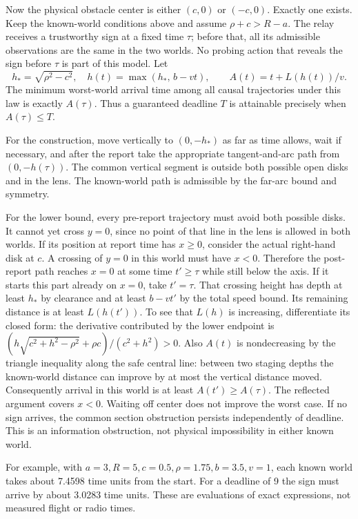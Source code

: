 \documentclass[11pt]{article}
\begin{document}
Now the physical obstacle center is either \((c,0)\) or \((-c,0)\).
Exactly one exists. Keep the known-world conditions above and assume
\(\rho+c>R-a\). The relay receives a trustworthy sign at a fixed
time \(\tau\); before that, all its admissible observations are the
same in the two worlds. No probing action that reveals the sign
before \(\tau\) is part of this model. Let
\[
 h_*=\sqrt{\rho^2-c^2},\quad
 h(t)=\max(h_*,\,b-vt),\qquad
 A(t)=t+L(h(t))/v .
\]
The minimum worst-world arrival time among all causal trajectories
under this law is exactly \(A(\tau)\). Thus a guaranteed deadline
\(T\) is attainable precisely when \(A(\tau)\le T\).

For the construction, move vertically to \((0,-h_*)\) as far as
time allows, wait if necessary, and after the report take the
appropriate tangent-and-arc path from \((0,-h(\tau))\).
The common vertical segment is outside both possible open disks
and in the lens. The known-world path is admissible by the
far-arc bound and symmetry.

For the lower bound, every pre-report trajectory must avoid
both possible disks. It cannot yet cross \(y=0\), since no point
of that line in the lens is allowed in both worlds. If its
position at report time has \(x\geq0\), consider the actual
right-hand disk at \(c\). A crossing of \(y=0\) in this world
must have \(x<0\). Therefore the post-report path reaches
\(x=0\) at some time \(t'\geq\tau\) while still below the axis.
If it starts this part already on \(x=0\), take \(t'=\tau\).
That crossing height has depth at least \(h_*\) by clearance
and at least \(b-vt'\) by the total speed bound. Its remaining
distance is at least \(L(h(t'))\). To see that \(L(h)\) is
increasing, differentiate its closed form: the derivative
contributed by the lower endpoint is
\((h\sqrt{c^2+h^2-\rho^2}+\rho c)/(c^2+h^2)>0\).
Also \(A(t)\) is nondecreasing by the triangle inequality along
the safe central line: between two staging depths the known-world
distance can improve by at most the vertical distance moved.
Consequently arrival in this world is at least \(A(t')\geq
A(\tau)\). The reflected argument covers \(x<0\). Waiting
off center does not improve the worst case. If no sign arrives,
the common section obstruction persists independently of deadline.
This is an information obstruction, not physical impossibility
in either known world.

For example, with \(a=3,R=5,c=0.5,\rho=1.75,b=3.5,v=1\),
each known world takes about 7.4598 time units from the start.
For a deadline of 9 the sign must arrive by about 3.0283
time units. These are evaluations of exact expressions, not
measured flight or radio times.
\end{document}

